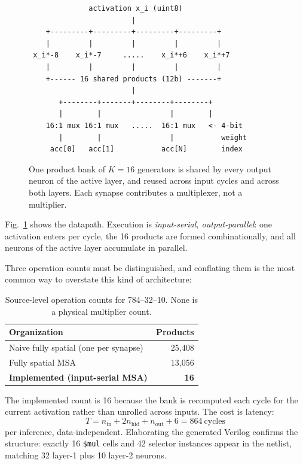 \documentclass[conference]{IEEEtran}
\begin{document}
\begin{figure}[t]
\centering
\footnotesize
\begin{verbatim}
              activation x_i (uint8)
                        |
    +---------+---------+---------+---------+
    |         |         |         |         |
 x_i*-8    x_i*-7     .....    x_i*+6    x_i*+7
    |         |         |         |         |
    +------ 16 shared products (12b) -------+
                        |
       +--------+-------+--------+--------+
       |        |                |        |
    16:1 mux 16:1 mux   .....  16:1 mux   <- 4-bit
       |        |                |           weight
     acc[0]   acc[1]           acc[N]        index
\end{verbatim}
\caption{One product bank of $K{=}16$ generators is shared by every output
neuron of the active layer, and reused across input cycles and across both
layers. Each synapse contributes a multiplexer, not a multiplier.}
\label{fig:msa}
\end{figure}

Fig.~\ref{fig:msa} shows the datapath. Execution is \emph{input-serial,
output-parallel}: one activation enters per cycle, the 16 products are formed
combinationally, and all neurons of the active layer accumulate in parallel.

Three operation counts must be distinguished, and conflating them is the most
common way to overstate this kind of architecture:

\begin{table}[h]
\centering
\caption{Source-level operation counts for 784--32--10. None is a physical
multiplier count.}
\label{tab:counts}
\begin{tabular}{lr}
\toprule
Organization & Products \\
\midrule
Naive fully spatial (one per synapse) & 25{,}408 \\
Fully spatial MSA & 13{,}056 \\
\textbf{Implemented (input-serial MSA)} & \textbf{16} \\
\bottomrule
\end{tabular}
\end{table}

The implemented count is 16 because the bank is recomputed each cycle for the
current activation rather than unrolled across inputs. The cost is latency:
\begin{equation}
T = n_{\mathrm{in}} + 2n_{\mathrm{hid}} + n_{\mathrm{out}} + 6 = 864~\text{cycles}
\end{equation}
per inference, data-independent. Elaborating the generated Verilog confirms the
structure: exactly 16 \texttt{\$mul} cells and 42 selector instances appear in
the netlist, matching 32 layer-1 plus 10 layer-2 neurons.
\end{document}
